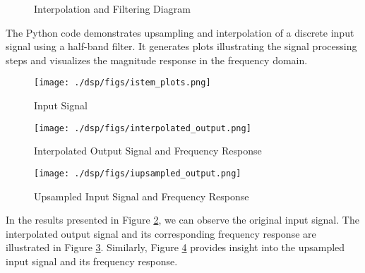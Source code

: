\documentclass{article}
\begin{document}
\begin{figure}[htbp]
\caption{Interpolation and Filtering Diagram}
    \label{fig:interpolation-diagram}
\end{figure}
The Python code demonstrates upsampling and interpolation of a discrete input signal using a half-band filter. It generates plots illustrating the signal processing steps 
and visualizes the magnitude response in the frequency domain.
\begin{center}
\end{center}

\begin{figure}[ht]
  \centering
  \texttt{[image: ./dsp/figs/istem\_plots.png]}
  \caption{ Input Signal}
  \label{fig:istem_plots}
\end{figure}
\begin{figure}[ht]
  \centering
  \texttt{[image: ./dsp/figs/interpolated\_output.png]}
  \caption{Interpolated Output Signal and Frequency Response}
  \label{fig:interpolated_output}
\end{figure}
\begin{figure}[ht]
  \centering
  \texttt{[image: ./dsp/figs/iupsampled\_output.png]}
  \caption{Upsampled Input Signal and Frequency Response}
  \label{fig:iupsampled_output}
\end{figure}
In the results presented in Figure \ref{fig:istem_plots}, we can observe the original input signal. The interpolated output signal and its corresponding frequency response are illustrated in Figure \ref{fig:interpolated_output}. Similarly, Figure \ref{fig:iupsampled_output} provides insight into the upsampled input signal and its frequency response.

\end{document}
